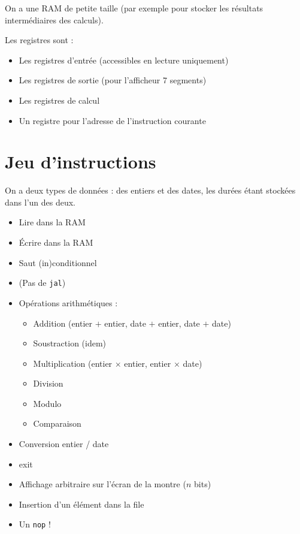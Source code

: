 \documentclass[a4paper]{article}
\begin{document}
On a une RAM de petite taille (par exemple pour stocker les résultats
intermédiaires des calculs).

Les registres sont :
\begin{itemize}
\item Les registres d'entrée (accessibles en lecture uniquement)
\item Les registres de sortie (pour l'afficheur 7 segments)
\item Les registres de calcul
\item Un registre pour l'adresse de l'instruction courante
\end{itemize}

\section{Jeu d'instructions}

On a deux types de données : des entiers et des dates, les durées étant
stockées dans l'un des deux.

\begin{itemize}
\item Lire dans la RAM
\item Écrire dans la RAM
\item Saut (in)conditionnel
\item (Pas de \texttt{jal})
\item Opérations arithmétiques :
\begin{itemize}
\item Addition (entier $+$ entier, date $+$ entier, date $+$ date)
\item Soustraction (idem)
\item Multiplication (entier $\times$  entier, entier $\times$ date)
\item Division
\item Modulo
\item Comparaison
\end{itemize}
\item Conversion entier / date
\item exit
\item Affichage arbitraire sur l'écran de la montre ($n$ bits)
\item Insertion d'un élément dans la file
\item Un \texttt{nop} !
\end{itemize}
\end{document}
